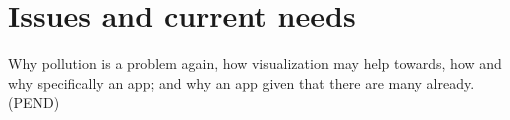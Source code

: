 \section{Issues and current needs}
Why pollution is a problem again, how visualization may help towards, how and why specifically an app; and why an app given that there are many already. 
(PEND)